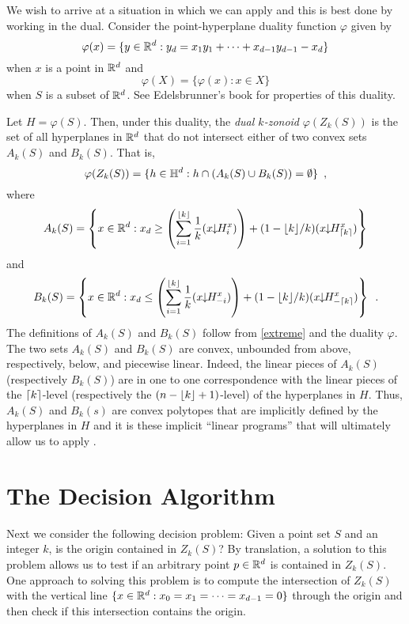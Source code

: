 \documentclass[lotsofwhite]{patmorin}
\newcommand{\drop}{\!\!\downarrow\!\!}
\newcommand{\dual}{\varphi}
\begin{document}
We wish to arrive at a situation in which we can apply 
and this is best done by working in the dual.
Consider the point-hyperplane duality function
$\dual$ given by 
\[
    \dual(x)=\{y\in\R^d : y_d = x_1y_1 +\cdots +x_{d-1}y_{d-1} - x_d \}
\] 
when $x$ is a point in $\mathbb{R}^d$ and
\[
     \dual(X) = \{\dual(x) : x\in X\}
\]
when $S$ is a subset of $\mathbb{R}^d$.  See Edelsbrunner's book \cite{e97}
for properties of this duality. 

Let $H=\dual(S)$.  Then,
under this duality, the \emph{dual $k$-zonoid} $\dual(Z_k(S))$ is the set 
of all hyperplanes in $\mathbb{R}^d$
that do not intersect either of two convex sets $A_k(S)$ and $B_k(S)$.
That is,
\[
     \dual(Z_k(S)) = \{ h\in\Hy^d : h\cap(A_k(S)\cup B_k(S)) = \emptyset \} \enspace ,
\]
where
\begin{equation}
   A_k(S) = \left\{x\in\R^d: x_d \ge 
\left(\sum_{i=1}^{\floor{k}} \frac{1}{k}(x\drop H_i^x)\right) +
          (1-\lfloor k\rfloor/k)(x\drop H_{\ceil{k}}^x) \right\}  \eqlabel{ra}
\end{equation} 
and
\begin{equation}
   B_k(S) = \left\{x\in\R^d: x_d \le 
\left(\sum_{i=1}^{\floor{k}} \frac{1}{k}(x\drop H_{-i}^x)\right) +
          (1-\lfloor k\rfloor/k)(x\drop H_{-\ceil{k}}^x) \right\} \enspace .
\end{equation}
The definitions of $A_k(S)$ and $B_k(S)$ follow from \eqref{extreme}
and the duality $\dual$.
The two sets $A_k(S)$ and $B_k(S)$ are convex, unbounded from above,
respectively, below, and piecewise linear.  Indeed, the linear pieces
of $A_k(S)$ (respectively $B_k(S)$) are in one to one correspondence
with the linear pieces of the $\left\lceil k \right\rceil$-level (respectively
the $(n-\left\lfloor k \right\rfloor+1)$-level) of the hyperplanes in $H$.  Thus,
$A_k(S)$ and $B_k(s)$ are convex polytopes that are implicitly defined
by the hyperplanes in $H$ and it is these implicit ``linear programs''
that will ultimately allow us to apply .


\section{The Decision Algorithm}

Next we consider the following decision problem:  Given a point set
$S$ and an integer $k$, is the origin contained in $Z_k(S)$?  By
translation, a solution to this problem allows us to test if an
arbitrary point $p\in\mathbb{R}^d$ is contained in $Z_k(S)$. One approach to
solving this problem is to compute the intersection of $Z_k(S)$ with
the vertical line $\{x\in\mathbb{R}^d:x_0=x_1=\cdots=x_{d-1}=0\}$ through the origin
and then check if this intersection contains the origin.
\end{document}
